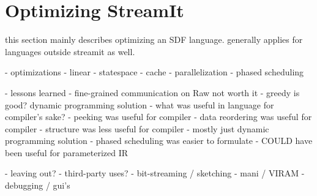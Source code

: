 \chapter{Optimizing StreamIt}
\label{chap:optimizing}

this section mainly describes optimizing an SDF language. generally
applies for languages outside streamit as well.

- optimizations
  - linear
  - statespace
  - cache
  - parallelization
  - phased scheduling

- lessons learned
  - fine-grained communication on Raw not worth it
  - greedy is good?  dynamic programming solution
  - what was useful in language for compiler's sake?
   - peeking was useful for compiler
   - data reordering was useful for compiler
   - structure was less useful for compiler
     - mostly just dynamic programming solution
     - phased scheduling was easier to formulate
     - COULD have been useful for parameterized IR

- leaving out?
  - third-party uses?
    - bit-streaming / sketching
    - mani / VIRAM
  - debugging / gui's
